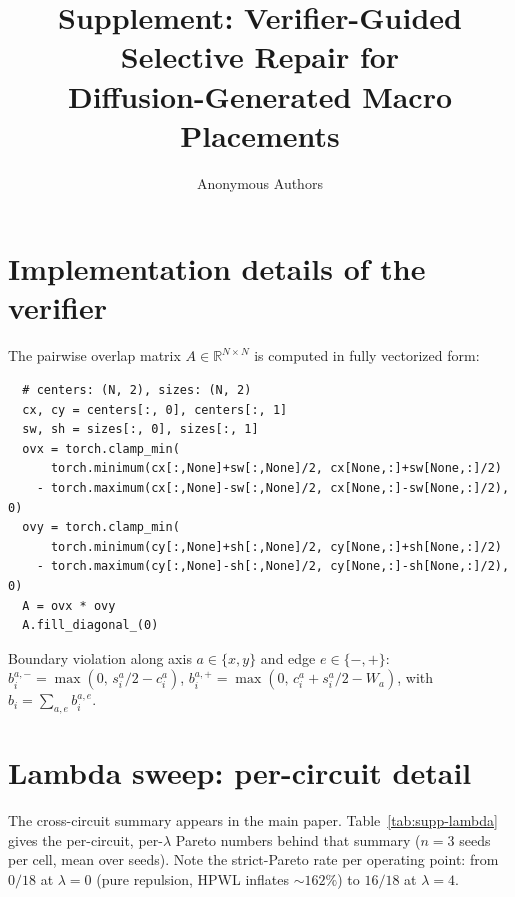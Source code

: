 \documentclass{article}
\title{Supplement: Verifier-Guided Selective Repair for\\
Diffusion-Generated Macro Placements}
\author{Anonymous Authors}
\begin{document}
\maketitle

\appendix

\section{Implementation details of the verifier}
\label{sec:supp-verifier}

The pairwise overlap matrix $A \in \mathbb{R}^{N \times N}$ is computed in
fully vectorized form:
\begin{verbatim}
  # centers: (N, 2), sizes: (N, 2)
  cx, cy = centers[:, 0], centers[:, 1]
  sw, sh = sizes[:, 0], sizes[:, 1]
  ovx = torch.clamp_min(
      torch.minimum(cx[:,None]+sw[:,None]/2, cx[None,:]+sw[None,:]/2)
    - torch.maximum(cx[:,None]-sw[:,None]/2, cx[None,:]-sw[None,:]/2), 0)
  ovy = torch.clamp_min(
      torch.minimum(cy[:,None]+sh[:,None]/2, cy[None,:]+sh[None,:]/2)
    - torch.maximum(cy[:,None]-sh[:,None]/2, cy[None,:]-sh[None,:]/2), 0)
  A = ovx * ovy
  A.fill_diagonal_(0)
\end{verbatim}
Boundary violation along axis $a \in \{x,y\}$ and edge $e \in \{-,+\}$:
$b_i^{a,-} = \max(0,\, s_i^a/2 - c_i^a)$,
$b_i^{a,+} = \max(0,\, c_i^a + s_i^a/2 - W_a)$, with
$b_i = \sum_{a,e} b_i^{a,e}$.

\section{Lambda sweep: per-circuit detail}
\label{sec:supp-lambda}

The cross-circuit summary appears in the main paper.  Table~\ref{tab:supp-lambda}
gives the per-circuit, per-$\lambda$ Pareto numbers behind that summary
($n=3$ seeds per cell, mean over seeds).  Note the strict-Pareto rate per
operating point: from $0/18$ at $\lambda=0$ (pure repulsion, HPWL inflates
$\sim 162\%$) to $16/18$ at $\lambda=4$.
\end{document}
